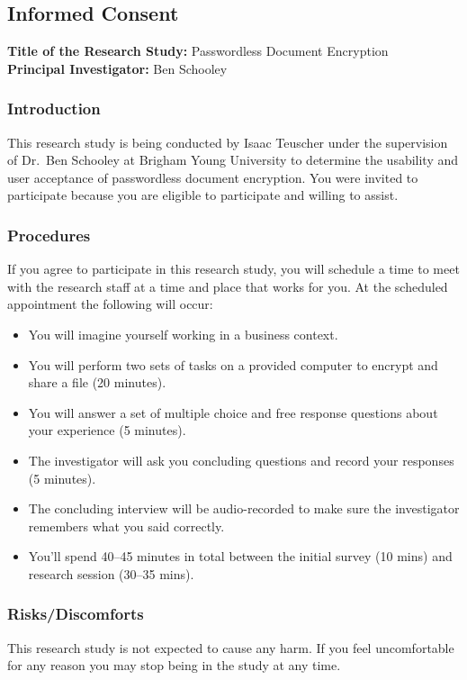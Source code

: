\subsection*{Informed Consent}

\textbf{Title of the Research Study:} Passwordless Document Encryption \\
\textbf{Principal Investigator:} Ben Schooley

\subsubsection*{Introduction}
This research study is being conducted by Isaac Teuscher under the supervision of Dr.~Ben Schooley at Brigham Young University to determine the usability and user acceptance of passwordless document encryption. You were invited to participate because you are eligible to participate and willing to assist.

\subsubsection*{Procedures}
If you agree to participate in this research study, you will schedule a time to meet with the research staff at a time and place that works for you. At the scheduled appointment the following will occur:

\begin{itemize}
    \item You will imagine yourself working in a business context.
    \item You will perform two sets of tasks on a provided computer to encrypt and share a file (20 minutes).
    \item You will answer a set of multiple choice and free response questions about your experience (5 minutes).
    \item The investigator will ask you concluding questions and record your responses (5 minutes).
    \item The concluding interview will be audio-recorded to make sure the investigator remembers what you said correctly.
    \item You'll spend 40--45 minutes in total between the initial survey (10 mins) and research session (30--35 mins).
\end{itemize}

\subsubsection*{Risks/Discomforts}
This research study is not expected to cause any harm. If you feel uncomfortable for any reason you may stop being in the study at any time.

